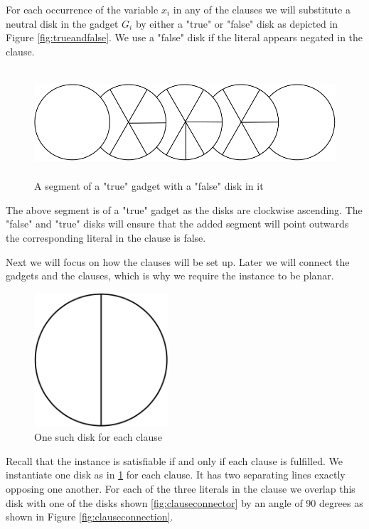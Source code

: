 \documentclass[a4paper,11pt]{article}
\begin{document}
For each occurrence of the variable $x_i$ in any of the clauses we will substitute a neutral disk in the gadget $G_i$ by either a "true" or "false" disk as depicted in Figure \ref{fig:trueandfalse}. We use a "false" disk if the literal appears negated in the clause.

\begin{figure}[h]
  \centering
  \includegraphics[height=4cm]{assets/np-hardness/negative.png}
  \caption{A segment of a "true" gadget with a "false" disk in it}
\end{figure}

The above segment is of a "true" gadget as the disks are clockwise ascending. The "false" and "true" disks will ensure that the added segment will point outwards the corresponding literal in the clause is false.

Next we will focus on how the clauses will be set up. Later we will connect the gadgets and the clauses, which is why we require the instance to be planar.

\begin{figure}[H]
  \centering
  \includegraphics[height=5cm]{assets/np-hardness/clause.png}
  \caption{One such disk for each clause}
  \label{fig:clausedisk}
\end{figure}

Recall that the instance is satisfiable if and only if each clause is fulfilled. We instantiate one disk as in \ref{fig:clausedisk} for each clause. It has two separating lines exactly opposing one another. For each of the three literals in the clause we overlap this disk with one of the disks shown \ref{fig:clauseconnector} by an angle of 90 degrees as shown in Figure \ref{fig:clauseconnection}.
\end{document}
